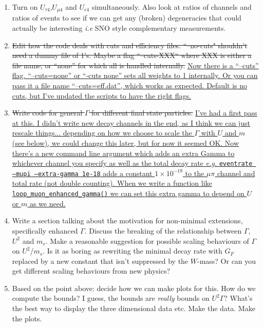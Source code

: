 \documentclass[11pt, a4paper]{article}
\newcommand{\newtext}[2]{\textcolor{#1}{\ul{#2}}}
\begin{document}
\begin{enumerate}
\item Turn on $U_{\tau 4}$,$U_{\mu 4}$ and $U_{e4}$ simultaneously. Also look
at ratios of channels and ratios of events to see if we can get any (broken)
degeneracies that could actually be interesting \emph{i.e} SNO style
complementary measurements.

\item \sout{Edit how the code deals with cuts and efficiency files.
``--no-cuts" shouldn't need a dummy file of 1's. Maybe a flag ``--cuts-XXX``
where XXX is either a file name, or ``none'' for which all is handled
internally.} \newtext{PB}{Now there is a ``--cuts'' flag. ``--cuts=none'' or
``-cuts none'' sets all weights to 1 internally. Or you can pass it a file name
``--cuts=eff.dat'', which works as expected. Default is no cuts, but I've
updated the scripts to have the right flags.}

\item \sout{Write code for general $\Gamma$ for different final state
particles.} \newtext{PB}{I've had a first pass at this. I didn't write new
decay channels in the end, as I think we can just rescale things...  depending
on how we choose to scale the $\Gamma$ with $U$ and $m$ (see below), we could
change this later, but for now it seemed OK. Now there's a new command
line argument which adds an extra Gamma to whichever channel you specify as well 
as the total decay rate \emph{e.g.} \texttt{eventrate --mupi --extra-gamma 1e-18}
adds a constant $1\times10^{-18}$ to the $\mu\pi$ channel and total rate (not
double counting). When we write a function like \texttt{loop\_muon\_enhanced\_gamma()} we 
can set this extra gamma to depend on $U$ or $m$ as we need.} 

\item Write a section talking about the motivation for non-minimal extensions,
specifically enhanced $\Gamma$. Discuss the breaking of the relationship
between $\Gamma$, $U^2$ and $m_s$.  Make a reasonable suggestion for possible
scaling behaviours of $\Gamma$ on $U^2$/$m_s$. Is it as boring as rewriting the
minimal decay rate with $G_F$ replaced by a new constant that isn't suppressed
by the $W$-mass? Or can you get different scaling behaviours from new physics?

\item Based on the point above: decide how we can make plots for this. How do
we compute the bounds? I guess, the bounds are \emph{really} bounds on
$U^2\Gamma$? What's the best way to display the three dimensional data etc.
Make the data. Make the plots.


\end{enumerate}
\end{document}
